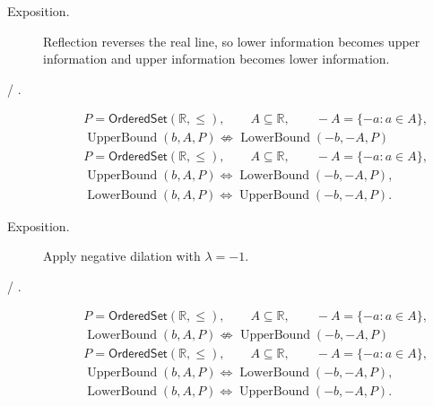\begin{remark*}
\begin{description}
\item[Exposition.]
Reflection reverses the real line, so lower information becomes upper
information and upper information becomes lower information.


  \item[ / .]

\[
\begin{aligned}
&P=\mathsf{OrderedSet}(\mathbb{R},\leq),\qquad
A\subseteq\mathbb{R},\qquad -A=\{-a:a\in A\},\\
&\operatorname{UpperBound}(b,A,P)\not\Longleftrightarrow\operatorname{LowerBound}(-b,-A,P)
\end{aligned}
\]
\[
\begin{aligned}
&P=\mathsf{OrderedSet}(\mathbb{R},\leq),\qquad
A\subseteq\mathbb{R},\qquad -A=\{-a:a\in A\},\\
&\operatorname{UpperBound}(b,A,P)\Longleftrightarrow\operatorname{LowerBound}(-b,-A,P),\\
&\operatorname{LowerBound}(b,A,P)\Longleftrightarrow\operatorname{UpperBound}(-b,-A,P).
\end{aligned}
\]
\end{description}
\end{remark*}

\begin{remark*}
\begin{description}
\item[Exposition.]
Apply negative dilation with $\lambda=-1$.


  \item[ / .]

\[
\begin{aligned}
&P=\mathsf{OrderedSet}(\mathbb{R},\leq),\qquad
A\subseteq\mathbb{R},\qquad -A=\{-a:a\in A\},\\
&\operatorname{LowerBound}(b,A,P)\not\Longleftrightarrow\operatorname{UpperBound}(-b,-A,P)
\end{aligned}
\]
\[
\begin{aligned}
&P=\mathsf{OrderedSet}(\mathbb{R},\leq),\qquad
A\subseteq\mathbb{R},\qquad -A=\{-a:a\in A\},\\
&\operatorname{UpperBound}(b,A,P)\Longleftrightarrow\operatorname{LowerBound}(-b,-A,P),\\
&\operatorname{LowerBound}(b,A,P)\Longleftrightarrow\operatorname{UpperBound}(-b,-A,P).
\end{aligned}
\]
\end{description}
\end{remark*}

